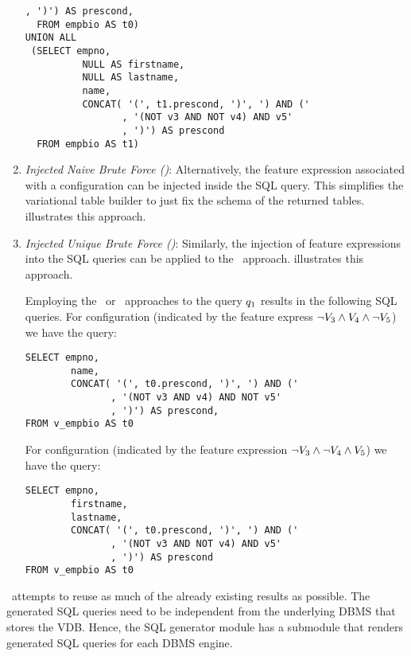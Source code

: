 \begin{enumerate}
\begin{example}
\begin{lstlisting}[basicstyle=\footnotesize\ttfamily,columns=flexible,lineskip=0.5\baselineskip]
                 , ')') AS prescond,
  FROM empbio AS t0) 
UNION ALL 
 (SELECT empno,
          NULL AS firstname,
          NULL AS lastname,
          name,
          CONCAT( '(', t1.prescond, ')', ') AND ('
                 , '(NOT v3 AND NOT v4) AND v5'
                 , ')') AS prescond
  FROM empbio AS t1)
 \end{lstlisting}
%
\end{example}
%
\item 
\emph{Injected Naive Brute Force (\nbfi)}: 
Alternatively, the feature expression associated with a configuration can be injected
inside the SQL query. This simplifies the variational table builder to just fix the 
schema of the returned tables.  illustrates this approach. 
%
\item 
\emph{Injected Unique Brute Force (\ubfi)}:
Similarly, the injection of feature expressions into the SQL queries can be applied to
the \ubf\ approach.  illustrates this approach.
%
\begin{example}
\label{eg:ubfi}
Employing the \nbfi\ or \ubfi\ approaches to the query $\vQ_1$ results in the following SQL queries.
For configuration \setDef {\vFour} (indicated by the feature
express $\neg \vThree \wedge \vFour \wedge \neg \vFive$) we have the query:
%
\begin{lstlisting}[basicstyle=\footnotesize\ttfamily,columns=flexible,lineskip=0.5\baselineskip]
SELECT empno, 
        name,
        CONCAT( '(', t0.prescond, ')', ') AND ('
               , '(NOT v3 AND v4) AND NOT v5'
               , ')') AS prescond,
FROM v_empbio AS t0
\end{lstlisting}
%
For configuration \setDef {\vFive} (indicated 
by the feature expression $\neg \vThree \wedge \neg \vFour \wedge \vFive$) we have the
query:
%
\begin{lstlisting}[basicstyle=\footnotesize\ttfamily,columns=flexible,lineskip=0.5\baselineskip]
SELECT empno,
        firstname, 
        lastname,
        CONCAT( '(', t0.prescond, ')', ') AND ('
               , '(NOT v3 AND NOT v4) AND v5'
               , ')') AS prescond
FROM v_empbio AS t0
 \end{lstlisting}
%
\end{example}
\end{enumerate}

\uav\ attempts to reuse as much of the already existing results as possible. 
%
The generated SQL queries need to be independent from the 
underlying DBMS that stores the VDB. Hence, the SQL generator module
has a submodule that renders generated SQL queries for each DBMS engine. 


